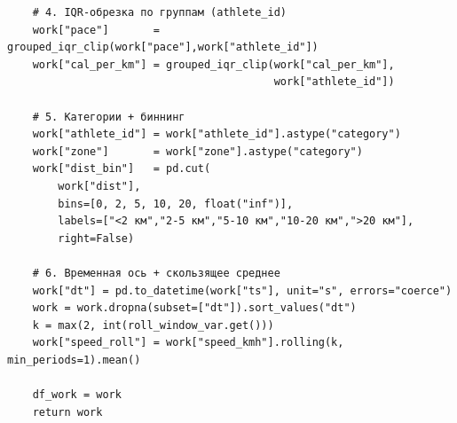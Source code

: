 \documentclass[oneside,a4paper,14pt]{extarticle}
\begin{document}
\begin{verbatim}
    # 4. IQR-обрезка по группам (athlete_id)
    work["pace"]       = grouped_iqr_clip(work["pace"],work["athlete_id"])
    work["cal_per_km"] = grouped_iqr_clip(work["cal_per_km"],
                                          work["athlete_id"])

    # 5. Категории + биннинг
    work["athlete_id"] = work["athlete_id"].astype("category")
    work["zone"]       = work["zone"].astype("category")
    work["dist_bin"]   = pd.cut(
        work["dist"],
        bins=[0, 2, 5, 10, 20, float("inf")],
        labels=["<2 км","2-5 км","5-10 км","10-20 км",">20 км"],
        right=False)

    # 6. Временная ось + скользящее среднее
    work["dt"] = pd.to_datetime(work["ts"], unit="s", errors="coerce")
    work = work.dropna(subset=["dt"]).sort_values("dt")
    k = max(2, int(roll_window_var.get()))
    work["speed_roll"] = work["speed_kmh"].rolling(k, min_periods=1).mean()

    df_work = work
    return work
\end{verbatim}
\end{document}

